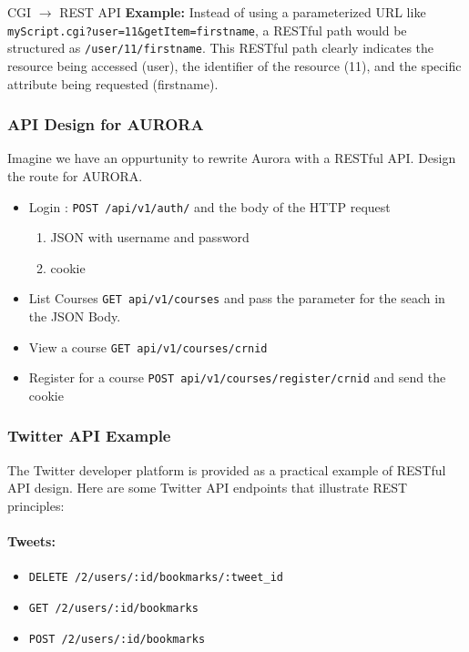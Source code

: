 \begin{example}{CGI $\rightarrow$ REST API}
\textbf{Example:} Instead of using a parameterized URL like \texttt{myScript.cgi?user=11\&getItem=firstname}, a RESTful path would be structured as \texttt{/user/11/firstname}. This RESTful path clearly indicates the resource being accessed (user), the identifier of the resource (11), and the specific attribute being requested (firstname).
\end{example}

\subsubsection{API Design for AURORA}
Imagine we have an oppurtunity to rewrite Aurora with a RESTful API.  Design the route for AURORA. 
\begin{itemize}[noitemsep]
	\item Login : \texttt{POST /api/v1/auth/} and the body of the HTTP request
		\begin{enumerate} [label=\alph*., noitemsep] %
            \item JSON with username and password
            \item cookie
        \end{enumerate}
	\item List Courses \texttt{GET api/v1/courses} and pass the parameter for the seach in the JSON Body.
	\item View a course \texttt{GET api/v1/courses/crnid}
	\item Register for a course \texttt{POST api/v1/courses/register/crnid} and send the cookie 
\end{itemize}

\subsubsection{Twitter API Example}

The Twitter developer platform is provided as a practical example of RESTful API design. Here are some Twitter API endpoints that illustrate REST principles:

\paragraph{Tweets:}
\begin{itemize}[noitemsep, topsep=4pt]
    \item \texttt{DELETE /2/users/:id/bookmarks/:tweet\_id}
    \item \texttt{GET /2/users/:id/bookmarks}
    \item \texttt{POST /2/users/:id/bookmarks}
\end{itemize}

